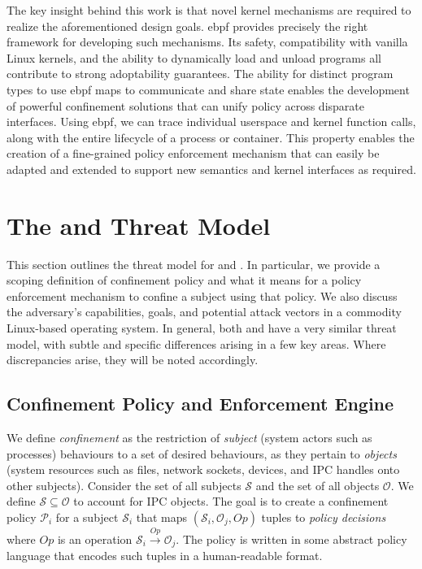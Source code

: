 The key insight behind this work is that novel kernel mechanisms are required to realize
the aforementioned design goals. \gls{ebpf} provides precisely the right framework for
developing such mechanisms. Its safety, compatibility with vanilla Linux kernels, and the
ability to dynamically load and unload programs all contribute to strong adoptability
guarantees. The ability for distinct program types to use \gls{ebpf} maps to communicate
and share state enables the development of powerful confinement solutions that can unify
policy across disparate interfaces. Using \gls{ebpf}, we can trace individual userspace
and kernel function calls, along with the entire lifecycle of a process or container. This
property enables the creation of a fine-grained policy enforcement mechanism that can
easily be adapted and extended to support new semantics and kernel interfaces as required.



\section{The \bpfbox{} and \bpfcontain{} Threat Model}%
\label{s:cp-threat-model}

This section outlines the threat model for \bpfbox{} and \bpfcontain{}. In particular, we
provide a scoping definition of confinement policy and what it means for a policy
enforcement mechanism to confine a subject using that policy. We also discuss the
adversary's capabilities, goals, and potential attack vectors in a commodity Linux-based
operating system. In general, both \bpfbox{} and \bpfcontain{} have a very similar threat
model, with subtle and specific differences arising in a few key areas. Where
discrepancies arise, they will be noted accordingly.

\subsection{Confinement Policy and Enforcement Engine}

We define \textit{confinement} as the restriction of \textit{subject} (system actors such
as processes) behaviours to a set of desired behaviours, as they pertain to
\textit{objects} (system resources such as files, network sockets, devices, and IPC
handles onto other subjects). Consider the set of all subjects $\mathcal{S}$ and the set
of all objects $\mathcal{O}$. We define $\mathcal{S} \subseteq \mathcal{O}$ to account for
IPC objects. The goal is to create a confinement policy $\mathcal{P}_i$ for a subject
$\mathcal{S}_i$ that maps $(\mathcal{S}_i, \mathcal{O}_j, Op)$ tuples to \textit{policy
decisions} where $Op$ is an operation $\mathcal{S}_i \xrightarrow{Op} \mathcal{O}_j$.  The
policy is written in some abstract policy language that encodes such tuples in
a human-readable format.

